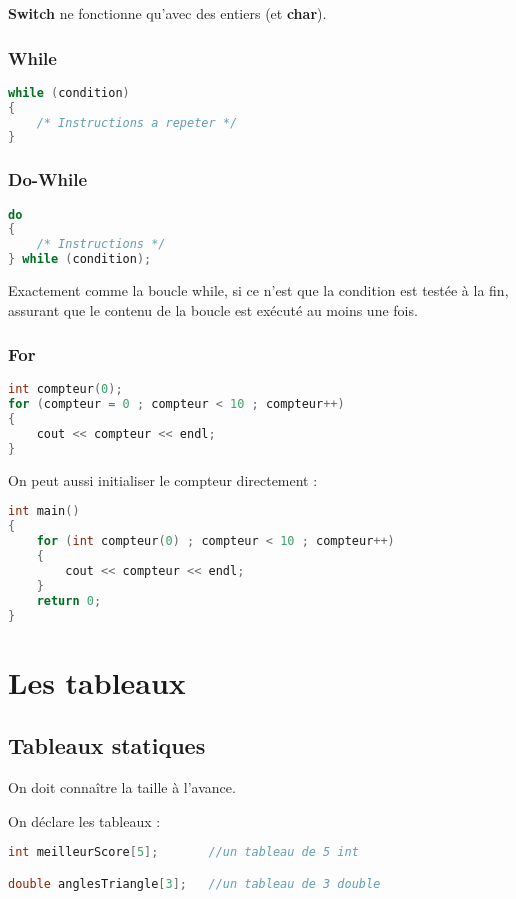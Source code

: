 \documentclass[a4paper,twoside]{article}
\begin{document}
\begin{remarque}
\textbf{Switch} ne fonctionne qu'avec des entiers (et \textbf{char}).
\end{remarque}

\subsubsection{While}
\begin{lstlisting}[language=C++]
while (condition)
{
    /* Instructions a repeter */
}
\end{lstlisting}

\subsubsection{Do-While}
\begin{lstlisting}[language=C++]
do
{
    /* Instructions */
} while (condition);
\end{lstlisting}
Exactement comme la boucle while, si ce n'est que la condition est testée à la fin, assurant que le contenu de la boucle est 
exécuté au moins une fois.

\subsubsection{For}
\begin{lstlisting}[language=C++]
int compteur(0);
for (compteur = 0 ; compteur < 10 ; compteur++)
{
    cout << compteur << endl;
}
\end{lstlisting}

On peut aussi initialiser le compteur directement :
\begin{lstlisting}[language=C++]
int main()
{
    for (int compteur(0) ; compteur < 10 ; compteur++)
    {
        cout << compteur << endl;
    }
    return 0;
}
\end{lstlisting}

\section{Les tableaux}
\subsection{Tableaux statiques}
On doit connaître la taille à l'avance. 

On déclare les tableaux :
\begin{lstlisting}[language=C++]
int meilleurScore[5];       //un tableau de 5 int 

double anglesTriangle[3];   //un tableau de 3 double
\end{lstlisting}
\end{document}
